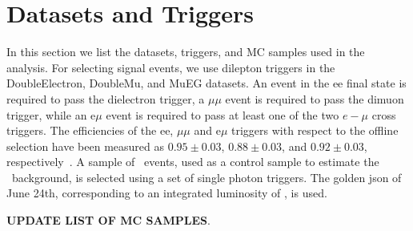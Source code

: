 \clearpage

\section{Datasets and Triggers}
\label{sec:datasets}

In this section we list the datasets, triggers, and MC samples used in the analysis. For selecting signal
events, we use dilepton triggers in the DoubleElectron, DoubleMu, and MuEG datasets. 
An event in the ee final state is required to pass the dielectron trigger, a 
$\mu\mu$ event is required to pass the dimuon trigger, while an e$\mu$ event is required to pass at least one 
of the two $e-\mu$ cross triggers. The efficiencies of the ee, $\mu\mu$ and e$\mu$ triggers with respect to the
offline selection have been measured as $0.95\pm0.03$, $0.88\pm0.03$, and $0.92\pm0.03$, respectively~\cite{ref:SSAN}.  
A sample of \gjets\ events, used as a control sample to estimate the \zjets\
background, is selected using a set of single photon triggers.
The golden json of June 24th, corresponding to an integrated luminosity of \lumi, is used. 

{\bf UPDATE LIST OF MC SAMPLES}.

